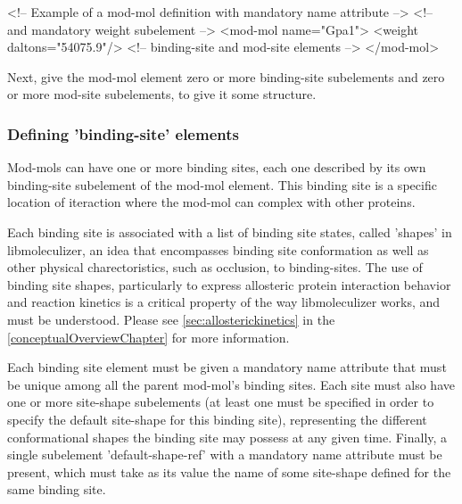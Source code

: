 \begin{ExampleXML}[caption=Basic mod-mol structure, label=basicmodmolstructure ]

<!-- Example of a mod-mol definition with mandatory name attribute -->
<!-- and mandatory weight subelement -->
<mod-mol name="Gpa1">
  <weight daltons="54075.9"/>
  <!-- binding-site and mod-site elements -->
</mod-mol>

\end{ExampleXML}

Next, give the mod-mol element zero or more binding-site subelements
and zero or more mod-site subelements, to give it some structure.  

\subsubsection{Defining 'binding-site' elements}
Mod-mols can have one or more binding sites, each one described by its
own binding-site subelement of the mod-mol element.  This binding site
is a specific location of iteraction where the mod-mol can complex
with other proteins.

Each binding site is associated with a list of binding site states,
called 'shapes' in libmoleculizer, an idea that encompasses binding
site conformation as well as other physical charectoristics, such as
occlusion, to binding-sites.  The use of binding site shapes,
particularly to express allosteric protein interaction behavior and
reaction kinetics is a critical property of the way libmoleculizer
works, and must be understood.  Please see
\ref{sec:allosterickinetics} in the \ref{conceptualOverviewChapter}
for more information.

Each binding site element must be given a mandatory name attribute
that must be unique among all the parent mod-mol's binding sites. Each
site must also have one or more site-shape subelements (at least one must be
specified in order to specify the default site-shape for this binding
site), representing the different conformational shapes the binding
site may possess at any given time.  Finally, a single subelement
'default-shape-ref' with a mandatory name attribute must be present,
which must take as its value the name of some site-shape defined for
the same binding site.

